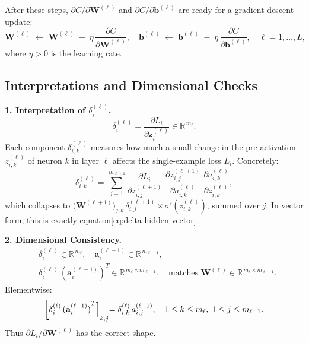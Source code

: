 \documentclass{article}
\begin{document}
\medskip
\noindent After these steps, \(\partial C/\partial \mathbf{W}^{(\ell)}\) and \(\partial C/\partial \mathbf{b}^{(\ell)}\) are ready for a gradient-descent update:
\[
    \mathbf{W}^{(\ell)} 
    \;\leftarrow\; \mathbf{W}^{(\ell)} \;-\; \eta\,\frac{\partial C}{\partial \mathbf{W}^{(\ell)}}, 
    \quad
    \mathbf{b}^{(\ell)} 
    \;\leftarrow\; \mathbf{b}^{(\ell)} \;-\; \eta\,\frac{\partial C}{\partial \mathbf{b}^{(\ell)}},
    \quad \ell = 1,\dots,L,
\]
where \(\eta > 0\) is the learning rate.

\subsection{Interpretations and Dimensional Checks}\label{sec:n-inputs-layers-details}

\noindent \textbf{1. Interpretation of \(\delta_{i}^{(\ell)}\).}  
\[
    \delta_{i}^{(\ell)} = \frac{\partial L_{i}}{\partial \mathbf{z}_{i}^{(\ell)}} 
    \in \mathbb{R}^{\,m_{\ell}}.
\]
Each component \(\delta_{i,k}^{(\ell)}\) measures how much a small change in the pre-activation \(z_{i,k}^{(\ell)}\) of neuron \(k\) in layer \(\ell\) affects the single-example loss \(L_{i}\).  Concretely:
\[
    \delta_{i,k}^{(\ell)} = 
    \sum_{j=1}^{\,m_{\ell+1}} 
      \frac{\partial L_{i}}{\partial z_{i,j}^{(\ell+1)}} 
      \;\frac{\partial z_{i,j}^{(\ell+1)}}{\partial a_{i,k}^{(\ell)}} 
      \;\frac{\partial a_{i,k}^{(\ell)}}{\partial z_{i,k}^{(\ell)}},
\]
which collapses to \({\bigl(\mathbf{W}^{(\ell+1)}\bigr)}_{j,k}\,\delta_{i,j}^{(\ell+1)}\times \sigma'(z_{i,k}^{(\ell)})\), summed over \(j\).  In vector form, this is exactly equation\eqref{eq:delta-hidden-vector}.

\medskip
\noindent \textbf{2. Dimensional Consistency.}
\[
\begin{aligned}
    &\delta_{i}^{(\ell)} \in \mathbb{R}^{\,m_{\ell}}, 
    \quad 
    \mathbf{a}_{i}^{(\ell-1)} \in \mathbb{R}^{\,m_{\ell-1}},\\
    &\delta_{i}^{(\ell)}\,{(\mathbf{a}_{i}^{(\ell-1)})}^{T} 
    \in \mathbb{R}^{\,m_{\ell} \times m_{\ell-1}},
    \quad 
    \text{matches } \mathbf{W}^{(\ell)} \in \mathbb{R}^{\,m_{\ell}\times m_{\ell-1}}.
\end{aligned}
\]
Elementwise:
\[
    \Bigl{[\delta_{i}^{(\ell)}\,{(\mathbf{a}_{i}^{(\ell-1)})}^{T}\Bigr]}_{k,j} 
    = \delta_{i,k}^{(\ell)}\,a_{i,j}^{(\ell-1)},
    \quad 
    1 \le k \le m_{\ell},\;1 \le j \le m_{\ell-1}.
\]
Thus \(\partial L_{i}/\partial \mathbf{W}^{(\ell)}\) has the correct shape.
\end{document}
